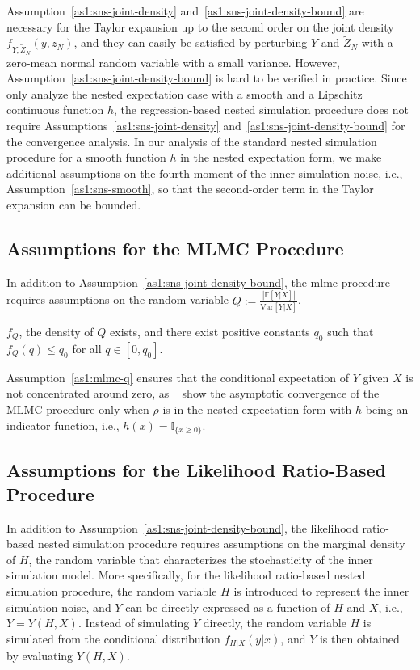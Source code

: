Assumption~\ref{as1:sns-joint-density} and~\ref{as1:sns-joint-density-bound} are necessary for the Taylor expansion up to the second order on the joint density $f_{Y,\tilde{Z}_N}(y,z_N)$, and they can easily be satisfied by perturbing $Y$ and $\tilde{Z}_N$ with a zero-mean normal random variable with a small variance.
However, Assumption~\ref{as1:sns-joint-density-bound} is hard to be verified in practice.
Since~\cite{broadie2015risk} only analyze the nested expectation case with a smooth and a Lipschitz continuous function $h$, the regression-based nested simulation procedure does not require Assumptions~\ref{as1:sns-joint-density} and~\ref{as1:sns-joint-density-bound} for the convergence analysis.
In our analysis of the standard nested simulation procedure for a smooth function $h$ in the nested expectation form, we make additional assumptions on the fourth moment of the inner simulation noise, i.e., Assumption~\ref{as1:sns-smooth}, so that the second-order term in the Taylor expansion can be bounded. 

\subsection{Assumptions for the MLMC Procedure}
In addition to Assumption~\ref{as1:sns-joint-density-bound}, the \gls{mlmc} procedure requires assumptions on the random variable $Q:= \frac{|\mathbb{E} \left[ Y | X \right]|}{\text{Var}[Y|X]}$.

\begin{assumption}\label{as1:mlmc-q}
    $f_Q$, the density of $Q$ exists, and there exist positive constants $q_0$ such that $f_Q(q) \leq q_0$ for all $q \in [0, q_0]$.
\end{assumption}

Assumption~\ref{as1:mlmc-q} ensures that the conditional expectation of $Y$ given $X$ is not concentrated around zero, as ~\cite{giles2019multilevel} show the asymptotic convergence of the MLMC procedure only when $\rho$ is in the nested expectation form with $h$ being an indicator function, i.e., $h(x) = \mathbb{I}_{\{x \geq 0\}}$.

\subsection{Assumptions for the Likelihood Ratio-Based Procedure}
In addition to Assumption~\ref{as1:sns-joint-density-bound}, the likelihood ratio-based nested simulation procedure requires assumptions on the marginal density of $H$, the random variable that characterizes the stochasticity of the inner simulation model.
More specifically, for the likelihood ratio-based nested simulation procedure, the random variable $H$ is introduced to represent the inner simulation noise, and $Y$ can be directly expressed as a function of $H$ and $X$, i.e., $Y = Y(H, X)$.
Instead of simulating $Y$ directly, the random variable $H$ is simulated from the conditional distribution $f_{H|X}(y|x)$, and $Y$ is then obtained by evaluating $Y(H, X)$.

